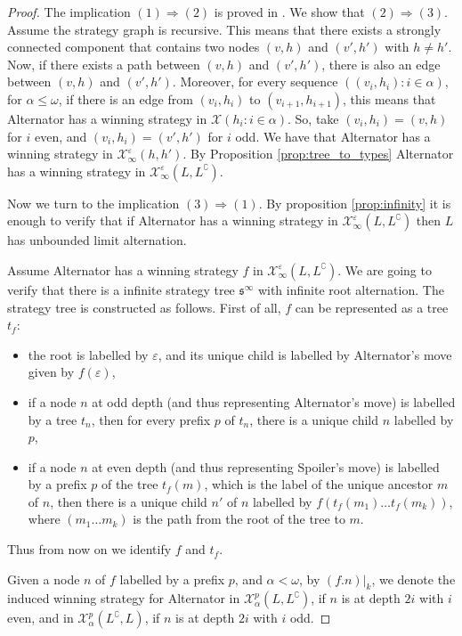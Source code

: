 \begin{proof}
The implication $(1) \Rightarrow (2)$ is proved in \cite{bp}.  
We show that $(2) \Rightarrow (3)$. Assume the strategy graph is recursive. This means that there exists a strongly connected component that contains two nodes $(v, h)$ and $(v', h')$ with $h \neq h'$. 
Now, if there exists a path between $(v, h)$ and $(v', h')$, there is also an edge between $(v, h)$ and $(v', h')$. 
Moreover, for every sequence $((v_i,h_i) : i \in \alpha)$, for $\alpha \leq \omega$, if there is an edge from $(v_i, h_i)$ to $(v_{i+1}, h_{i+1})$, this means that Alternator has a winning strategy in $\mathcal{X}(h_i: i \in \alpha)$. So, take $(v_i, h_i)= (v,h)$ for $i$ even, and $(v_i, h_i)= (v',h')$ for $i$ odd. We have that Alternator has a winning strategy in $\mathcal{X}^\varepsilon_\infty(h, h')$. By Proposition \ref{prop:tree_to_types}
Alternator has a winning strategy in  $\mathcal{X}^\varepsilon_\infty(L, L^\complement)$.


Now we turn to the implication  $(3) \Rightarrow (1)$. 
By proposition \ref{prop:infinity} it is enough to verify that 
 if Alternator has a winning strategy in $\mathcal{X}^\varepsilon_\infty(L, L^\complement)$ then $L$ has unbounded limit alternation.
 
Assume Alternator has a winning strategy $f$ in  $\mathcal{X}^\varepsilon_\infty(L, L^\complement)$. We are going to verify that there is a infinite strategy tree $\mathfrak{s}^\infty$ with infinite root alternation. The strategy tree is constructed as follows. First of all, $f$ can be represented as a tree $t_f$: 
\begin{itemize}
\item the root is labelled by $\varepsilon$, and its unique child is labelled by Alternator's move given by $f(\varepsilon)$,
\item if a node $n$ at odd depth (and thus representing Alternator's move) is labelled by a tree $t_n$, then for every prefix $p$ of $t_n$, there is a unique child $n$ labelled by $p$,
\item if a node $n$ at even depth (and thus representing Spoiler's move) is labelled by a prefix $p$ of the tree $t_f(m)$, which is the label of the unique ancestor $m$ of $n$, then there is a unique child $n'$ of $n$ labelled by $f(t_f(m_1)\dots t_f(m_k))$, where $(m_1\dots m_k)$ is the path from the root of the tree to $m$.
\end{itemize}
Thus from now on we identify $f$ and $t_f$.

Given a node $n$ of $f$ labelled by a prefix $p$, and $\alpha < \omega$,  by $(f.n)|_k$, we denote the induced  winning strategy  for Alternator in  $\mathcal{X}^p_\alpha(L, L^\complement)$, if $n$ is at depth $2i$ with $i$ even, and in  $\mathcal{X}^p_\alpha(L^\complement, L)$, if $n$ is at depth $2i$ with $i$ odd.


\end{proof}
